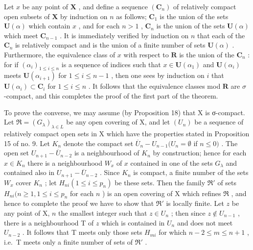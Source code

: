 Let \(x\) be any point of \(\mathbf{X}\) , and define a sequence \((\mathbf{C}_n)\) of relatively compact open subsets of \(\mathbf{X}\) by induction on \(n\) as follows; \(\mathbf{C}_1\) is the union of the sets \(\mathbf{U}(\alpha)\) which contain \(x\) , and for each \(n > 1\) , \(\mathbf{C}_n\) is the union of the sets \(\mathbf{U}(\alpha)\) which meet \(\mathbf{C}_{n-1}\) . It is immediately verified by induction on \(n\) that each of the \(\mathbf{C}_n\) is relatively compact and is the union of a finite number of sets \(\mathbf{U}(\alpha)\) . Furthermore, the equivalence class of \(x\) with respect to \(\mathbf{R}\) is the union of the \(\mathbf{C}_n\) : for if \((\alpha_i)_{1 \leqslant i \leqslant n}\) is a sequence of indices such that \(x \in \mathbf{U}(\alpha_1)\) and \(\mathbf{U}(\alpha_i)\) meets \(\mathbf{U}(\alpha_{i+1})\) for \(1 \leqslant i \leqslant n - 1\) , then one sees by induction on \(i\) that \(\mathbf{U}(\alpha_i) \subset \mathbf{C}_i\) for \(1 \leqslant i \leqslant n\) . It follows that the equivalence classes mod \(\mathbf{R}\) are \(\sigma\) -compact, and this completes the proof of the first part of the theorem.

To prove the converse, we may assume (by Proposition 18) that X is σ-compact. Let \(\Re = (G_{\lambda})_{\lambda \in L}\) be any open covering of X, and let \((U_n)\) be a sequence of relatively compact open sets in X which have the properties stated in Proposition 15 of no. 9. Let \(K_n\) denote the compact set \(\overline{U}_n - U_{n-1}(U_n = \emptyset\) if \(n \leqslant 0)\) . The open set \(U_{n+1} - \overline{U}_{n-2}\) is a neighbourhood of \(K_n\) by construction; hence for each \(x \in K_n\) there is a neighbourhood \(W_x\) of \(x\) contained in one of the sets \(G_{\lambda}\) and contained also in \(U_{n+1} - \overline{U}_{n-2}\) . Since \(K_n\) is compact, a finite number of the sets \(W_x\) cover \(K_n\) ; let \(H_{ni}(1 \leqslant i \leqslant p_n)\) be these sets. Then the family \(\Re'\) of sets \(H_{ni}(n \geqslant 1, 1 \leqslant i \leqslant p_n\) for each \(n\) ) is an open covering of X which refines \(\Re\) , and hence to complete the proof we have to show that \(\Re'\) is locally finite. Let \(z\) be any point of X, \(n\) the smallest integer such that \(z \in U_n\) ; then since \(z \notin U_{n-1}\) , there is a neighbourhood T of \(z\) which is contained in \(U_n\) and does not meet \(U_{n-2}\) . It follows that T meets only those sets \(H_{mi}\) for which \(n - 2 \leqslant m \leqslant n + 1\) , i.e.~T meets only a finite number of sets of \(\Re'\) .

